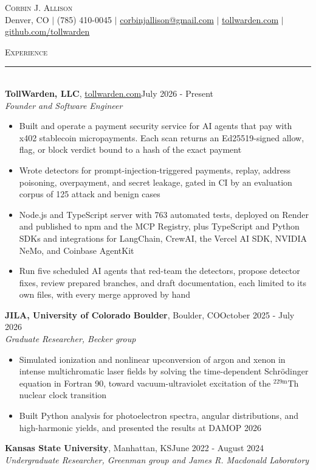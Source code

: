\documentclass[10pt]{article}
\newcommand{\sect}[1]{
\par\needspace{3\baselineskip}\vspace{8pt}\noindent\large{\textsc{#1}}\\[-8pt]\normalsize{\noindent\rule{\textwidth}{0.5pt}}\\[-2pt]
}
\newcommand{\job}[4]{\textbf{#1}, #2\hfill #3\\ \textit{#4}}
\begin{document}
\begin{center}
	{\LARGE{\textsc{Corbin J. Allison}}}\\[2pt]
	Denver, CO $ | $ (785) 410-0045 $ | $ \href{mailto:corbinjallison@gmail.com}{corbinjallison@gmail.com} $ | $ \href{https://tollwarden.com}{tollwarden.com} $ | $ \href{https://github.com/tollwarden/tollwarden}{github.com/tollwarden}
\end{center}

\sect{Experience}
\job{TollWarden, LLC}{\href{https://tollwarden.com}{tollwarden.com}}{July 2026 - Present}{Founder and Software Engineer}
\begin{itemize}
	\item Built and operate a payment security service for AI agents that pay with x402 stablecoin micropayments. Each scan returns an Ed25519-signed allow, flag, or block verdict bound to a hash of the exact payment
	\item Wrote detectors for prompt-injection-triggered payments, replay, address poisoning, overpayment, and secret leakage, gated in CI by an evaluation corpus of 125 attack and benign cases
	\item Node.js and TypeScript server with 763 automated tests, deployed on Render and published to npm and the MCP Registry, plus TypeScript and Python SDKs and integrations for LangChain, CrewAI, the Vercel AI SDK, NVIDIA NeMo, and Coinbase AgentKit
	\item Run five scheduled AI agents that red-team the detectors, propose detector fixes, review prepared branches, and draft documentation, each limited to its own files, with every merge approved by hand
\end{itemize}
\job{JILA, University of Colorado Boulder}{Boulder, CO}{October 2025 - July 2026}{Graduate Researcher, Becker group}
\begin{itemize}
	\item Simulated ionization and nonlinear upconversion of argon and xenon in intense multichromatic laser fields by solving the time-dependent Schr\"{o}dinger equation in Fortran 90, toward vacuum-ultraviolet excitation of the $^{229\mathrm{m}}$Th nuclear clock transition
	\item Built Python analysis for photoelectron spectra, angular distributions, and high-harmonic yields, and presented the results at DAMOP 2026
\end{itemize}
\job{Kansas State University}{Manhattan, KS}{June 2022 - August 2024}{Undergraduate Researcher, Greenman group and James R. Macdonald Laboratory}
\end{document}
